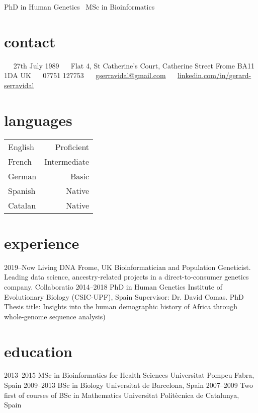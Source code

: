 \documentclass[]{friggeri-cv}
\begin{document}
       {PhD in Human Genetics \textbullet\ MSc in Bioinformatics}


\begin{aside}
  \section{contact}
    ~
    \faCalendar\ 
    27th July 1989
  	~
  	\faHome\
  	Flat 4, St Catherine's Court, Catherine Street
  	Frome BA11 1DA
  	UK
    ~
    \faMobile\
    07751 127753
    ~
    {\small \faEnvelope}\ 
    \href{mailto:gserravidal@gmail.com}{gserravidal@gmail.com}
    ~
    \faLinkedinSquare\ \href{www.linkedin.com/in/gerard-serravidal}{linkedin.com/in/gerard-serravidal}
    ~
  \section{languages}
  	\begin{tabular}{lr}
  	English & Proficient \\
	French & Intermediate \\
	German & Basic \\
	Spanish & Native \\
	Catalan & Native
	\end{tabular}
\end{aside}


\section{experience}
\begin{entrylist}
	\entry
		{2019--Now}
		{Living DNA}
		{Frome, UK}
		{Bioinformatician and Population Geneticist. Leading data science, ancestry-related projects in a direct-to-consumer genetics company. Collaboratio}
	\entry
		{2014--2018}
		{PhD in Human Genetics}
		{Institute of Evolutionary Biology (CSIC-UPF), Spain}
		{Supervisor: Dr. David Comas. PhD Thesis title: Insights into the human demographic history of Africa through whole-genome sequence analysis)}
\end{entrylist}
			


\section{education}
\begin{entrylist}
	\entry
		{2013--2015}
		{MSc in Bioinformatics for Health Sciences}
		{Universitat Pompeu Fabra, Spain}
		{}
	\entry
		{2009--2013}
		{BSc in Biology}
		{Universitat de Barcelona, Spain}
		{}
	\entry
		{2007--2009}
		{{\normalfont Two first of courses of} BSc in Mathematics}
		{Universitat Politècnica de Catalunya, Spain}{}
\end{entrylist}
\end{document}
